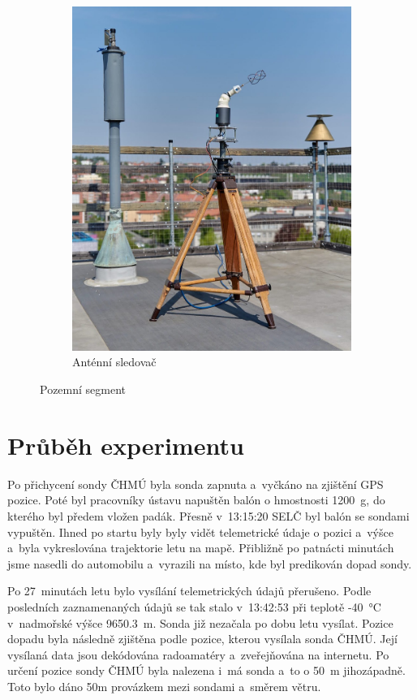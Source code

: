 \documentclass[twoside]{ctuthesis}
\theoremstyle{plain}
\theoremstyle{definition}
\theoremstyle{note}
\begin{document}
\begin{figure}[hbtp]
\begin{subfigure}{.49\textwidth}
			\includegraphics[height=1.2\textwidth]{Figures/tracker.jpg}
			\caption{Anténní sledovač}
			\label{fig:ground:tracker}
		\end{subfigure}
		\caption{Pozemní segment}
		\label{fig:ground}
	\end{figure}



	\section{Průběh experimentu}
	Po přichycení sondy ČHMÚ byla sonda zapnuta a~vyčkáno na zjištění GPS pozice. Poté byl pracovníky ústavu napuštěn balón o hmostnosti 1200~g, do kterého byl předem vložen padák. Přesně v~13:15:20 SELČ byl balón se sondami vypuštěn. Ihned po startu byly byly vidět telemetrické údaje o pozici a~výšce a~byla vykreslována trajektorie letu na mapě. Přibližně po patnácti minutách jsme nasedli do automobilu a~vyrazili na místo, kde byl predikován dopad sondy.

	Po 27~minutách letu bylo vysílání telemetrických údajů přerušeno. Podle posledních zaznamenaných údajů se tak stalo v~13:42:53 při teplotě -40~°C v~nadmořské výšce 9650.3~m. Sonda již nezačala po dobu letu vysílat. Pozice dopadu byla následně zjištěna podle pozice, kterou vysílala sonda ČHMÚ. Její vysílaná data jsou dekódována radoamatéry a~zveřejňována na internetu. Po určení pozice sondy ČHMÚ byla nalezena i~má sonda a~to o 50~m jihozápadně. Toto bylo dáno 50m provázkem mezi sondami a~směrem větru.
\end{document}
